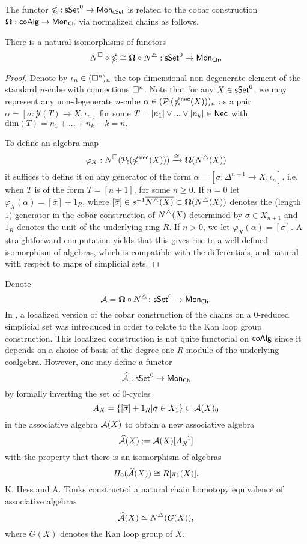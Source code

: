 The functor $\mathbb{\Omega}: \mathsf{sSet}^0 \to \mathsf{Mon}_{\mathsf{cSet}}$ is related to the cobar construction $\mathbf{\Omega}: \mathsf{coAlg} \to \mathsf{Mon}_{\mathsf{Ch}}$ via normalized chains as follows.

\begin{proposition} \label{gcobarandcobar}
There is a natural isomorphisms of functors 
$$N^{\square} \circ \mathbb{\Omega} \cong \mathbf{\Omega} \circ N^{\triangle}: \mathsf{sSet}^0 \to \mathsf{Mon}_{\mathsf{Ch}}.$$
\end{proposition}

\begin{proof} 
Denote by $\iota_n \in (\square^n)_n$ the top dimensional non-degenerate element of the standard $n$-cube with connections $\square^n$. Note that for any $X \in \mathsf{sSet}^0$, we may represent any non-degenerate $n$-cube $\alpha \in (\mathcal{P}_!(\mathbb{\Omega}^{\text{nec}}(X)))_n$ as a pair $\alpha=[\sigma: \mathcal{Y}(T) \to X, \iota_n]$ for some $T=[n_1] \vee ... \vee [n_k] \in \mathsf{Nec}$ with $\text{dim}(T)=n_1+ ...+n_k-k=n.$

To define an algebra map
$$\varphi_X: N^{\square}(\mathcal{P}_!(\mathbb{\Omega}^{\text{nec}}(X))) \xrightarrow{\cong} \mathbf{\Omega}(N^{\triangle}(X))$$
it suffices to define it on any generator of the form $\alpha=[\sigma \colon \Delta^{n+1} \to X, \iota_{n}]$, i.e. when $T$ is of the form $T=[n+1]$, for some $n\geq0$. If $n=0$ let $\varphi_X(\alpha)= [\overline{\sigma}]+ 1_R$, where $[\overline{\sigma}] \in s^{-1} \overline{ N^{\triangle}(X)} \subset \mathbf{\Omega}(N^{\triangle}(X))$ denotes the (length $1$) generator in the cobar construction of $N^{\triangle}(X)$ determined by $\sigma \in X_{n+1}$ and $1_R$ denotes the unit of the underlying ring $R$. If $n>0$, we let $\varphi_X(\alpha)=[\overline{\sigma}]$. A straightforward computation yields that this gives rise to a well defined isomorphism of algebras, which is compatible with the differentials, and natural with respect to maps of simplicial sets.  
\end{proof}
Denote $$\mathcal{A}= \mathbf{\Omega} \circ N^{\triangle} \colon \mathsf{sSet}^0 \to \mathsf{Mon}_{\mathsf{Ch}}.$$ In \cite{Hess-Tonks}, a localized version of the cobar construction of the chains on a $0$-reduced simplicial set was introduced in order to relate to the Kan loop group construction. This localized construction is not quite functorial on $\mathsf{coAlg}$ since it depends on a choice of basis of the degree one $R$-module of the underlying coalgebra. However, one may define a functor $$\widehat{\mathcal{A}}: \mathsf{sSet}^0 \to \mathsf{Mon}_{\mathsf{Ch}}$$
by formally inverting the set of $0$-cycles $$A_X=\{ [\overline{\sigma}]+1_R | \sigma \in X_1 \} \subset \mathcal{A}(X)_0$$ in the associative algebra $\mathcal{A}(X)$ to obtain a new associative algebra
$$\widehat{\mathcal{A}}(X):= \mathcal{A}(X)[A_X^{-1}]$$
with the property that there is an isomorphism of algebras $$H_0(\widehat{\mathcal{A}}(X)) \cong R[\pi_1(X)].$$
K. Hess and A. Tonks constructed a natural chain homotopy equivalence of associative algebras $$\widehat{\mathcal{A}}(X)\simeq N^{\triangle}(G(X)),$$ where $G(X)$ denotes the Kan loop group of $X$. 

